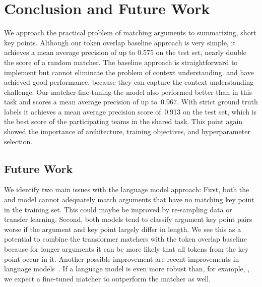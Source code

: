 \section{Conclusion and Future Work}\label{conclusion}

We approach the practical problem of matching arguments to summarizing, short key points.
Although our token overlap baseline approach is very simple, it achieves a mean average precision of up to 0.575 on the test set, nearly double the score of a random matcher. 
The baseline approach is straightforward to implement but cannot eliminate the problem of context understanding. 
\Roberta and \Bert have achieved good performance, because they can capture the context understanding challenge. 
Our matcher fine-tuning the \RobertaBase model also performed better than \Bert in this task and scores a mean average precision of up to~0.967.
With strict ground truth labels it achieves a mean average precision score of~0.913 on the test set, which is the best score of the participating teams in the shared task.
This point again showed the importance of architecture, training objectives, and hyperparameter selection.

\subsection{Future Work}

We identify two main issues with the language model approach:
First, both the \BertBase and \RobertaBase model cannot adequately match arguments that have no matching key point in the training set.
This could maybe be improved by re-sampling data or transfer learning.
Second, both models tend to classify argument key point pairs worse if the argument and key point largely differ in length.
We see this as a potential to combine the transformer matchers with the token overlap baseline because for longer arguments it can be more likely that all tokens from the key point occur in it.
Another possible improvement are recent improvements in language models~\cite{Sun2021WFDPSLCZLLWGLSSLOYTWW}.
If a language model is even more robust than, for example, \Roberta, we expect a fine-tuned matcher to outperform the \RobertaBase matcher as well.
